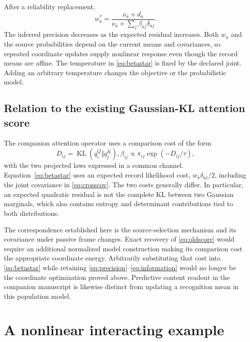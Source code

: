 \documentclass[11pt]{article}
\newcommand{\KL}{\operatorname{KL}}
\begin{document}
After a reliability replacement,
\begin{equation}
w_a^*=\frac{\nu_a+d_a}{\nu_a+\sum_j\beta_{aj}\delta_{aj}}.
\label{eq:reliability}
\end{equation}
The inferred precision decreases as the expected residual increases. Both $w_a$ and the source probabilities depend on the current means and covariances, so repeated coordinate updates supply nonlinear response even though the record means are affine. The temperature in \eqref{eq:betastar} is fixed by the declared joint. Adding an arbitrary temperature changes the objective or the probabilistic model.

\subsection{Relation to the existing Gaussian-KL attention score}
\label{sec:scorecomparison}

The companion attention operator uses a comparison cost of the form
\begin{equation}
D_{ij}=\KL(q_i^{Q}\Vert q_j^{K}),
\beta_{ij}\propto\pi_{ij}\exp(-D_{ij}/\tau),
\label{eq:oldscore}
\end{equation}
with the two projected laws expressed in a common channel. Equation~\eqref{eq:betastar} uses an expected record likelihood cost, $w_a\delta_{aj}/2$, including the joint covariance in \eqref{eq:crosscov}. The two costs generally differ. In particular, an expected quadratic residual is not the complete KL between two Gaussian marginals, which also contains entropy and determinant contributions tied to both distributions.

The correspondence established here is the source-selection mechanism and its covariance under passive frame changes. Exact recovery of \eqref{eq:oldscore} would require an additional normalized model construction making its comparison cost the appropriate coordinate energy. Arbitrarily substituting that cost into \eqref{eq:betastar} while retaining \eqref{eq:precision}--\eqref{eq:information} would no longer be the coordinate optimization proved above. Predictive content readout in the companion manuscript is likewise distinct from updating a recognition mean in this population model.

\section{A nonlinear interacting example}
\label{sec:example}
\end{document}
